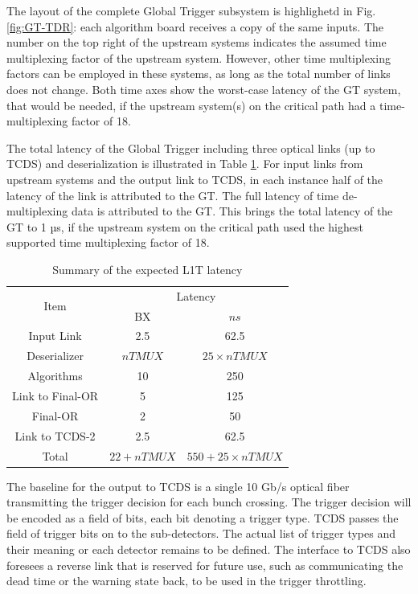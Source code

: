 \documentclass[../../main.tex]{subfiles}
\begin{document}
The layout of the complete Global Trigger subsystem is highlighetd in Fig. \ref{fig:GT-TDR}: each algorithm board receives a copy of the same inputs. The number on the top right of the upstream systems indicates the assumed time multiplexing factor of the upstream system. However, other time multiplexing factors can be employed in these systems, as long as the total number of links does not change. Both time axes show the worst-case latency of the GT system, that would be needed, if the upstream system(s) on the critical path had a time-multiplexing factor of 18.

The total latency of the Global Trigger including three optical links (up to TCDS) and deserialization is illustrated in Table \ref{tab:GT-lat}. For input links from upstream systems and the output link to TCDS, in each instance half of the latency of the link is attributed to the GT. The full latency of time de-multiplexing data is attributed to the GT. This brings the total latency of the GT to 1 µs, if the upstream system on the critical path used the highest supported time multiplexing factor of 18.

\begin{table}[h]
    \centering
    \begin{tabular}{|c|c|c|}
        \hline
        \multirow{2}{*}{Item} & \multicolumn{2}{c|}{Latency}   \\
        \cline{2-3}
         & BX & $n s$ \\
         \hline
         Input Link   & 2.5 & 62.5 \\
         Deserializer & $nTMUX$ & $25\times nTMUX$ \\
         Algorithms   & 10 & 250 \\
         Link to Final-OR & 5 & 125 \\
         Final-OR & 2 & 50 \\
         Link to TCDS-2 & 2.5 & 62.5 \\
         \hline
         Total          & $22 + nTMUX$ & $550 + 25\times nTMUX$ \\
         \hline
    \end{tabular}
    \caption{Summary of the expected L1T latency}
    \label{tab:GT-lat}
\end{table}

The baseline for the output to TCDS is a single 10 Gb/s optical fiber transmitting the trigger decision for each bunch crossing. The trigger decision will be encoded as a field of bits, each bit denoting a trigger type. TCDS passes the field of trigger bits on to the sub-detectors. The actual list of trigger types and their meaning or each detector remains to be defined.  
The interface to TCDS also foresees a reverse link that is reserved for future use, such as communicating the dead time or the warning state back, to be used in the trigger throttling.
\end{document}
